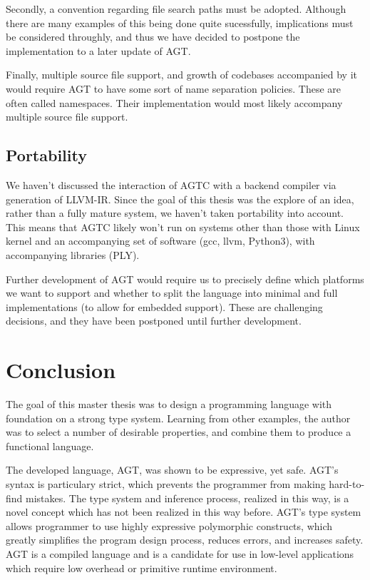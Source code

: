\documentclass[times, utf8, diplomski]{fer}
\theoremstyle{definition}
\begin{document}
Secondly, a convention regarding file search paths must be adopted. Although there are many
examples of this being done quite sucessfully, implications must be considered throughly,
and thus we have decided to postpone the implementation to a later update of AGT.

Finally, multiple source file support, and growth of codebases accompanied by it would require
AGT to have some sort of name separation policies. These are often called namespaces.
Their implementation would most likely accompany multiple source file support.

\section{Portability}

We haven't discussed the interaction of AGTC with a backend compiler via generation of LLVM-IR.
Since the goal of this thesis was the explore of an idea, rather than a fully mature system,
we haven't taken portability into account. This means that AGTC likely won't run on systems
other than those with Linux kernel and an accompanying set of software (gcc, llvm, Python3),
with accompanying libraries (PLY).

Further development of AGT would require us to precisely define which platforms we want to support and
whether to split the language into minimal and full implementations (to allow for embedded support).
These are challenging decisions, and they have been postponed until further development.

\chapter{Conclusion}\label{chap:concl}

The goal of this master thesis was to design a programming language with foundation
on a strong type system. Learning from other examples, the author was to select a number
of desirable properties, and combine them to produce a functional language.

The developed language, AGT, was shown to be expressive, yet safe. 
AGT's syntax is particulary strict, which prevents the programmer from making hard-to-find mistakes.
The type system and inference process, realized in this way, is a novel concept which 
has not been realized in this way before. AGT's type system allows programmer to use
highly expressive polymorphic constructs, which greatly simplifies the program design process,
reduces errors, and increases safety. AGT is a compiled language and is a candidate
for use in low-level applications which require low overhead or primitive runtime environment.
\end{document}
